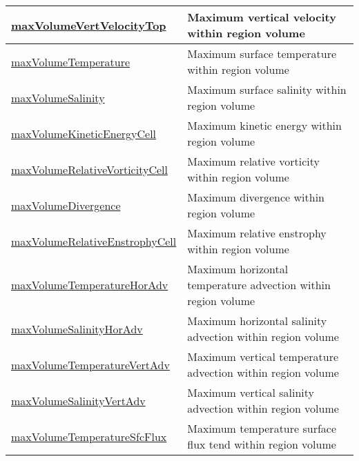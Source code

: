 {\begin{center}
\begin{longtable}{| p{2.0in} | p{4.0in} |}
    \hline
    \hyperref[subsec:var_sec_layerVolumeWeightedAverageAM_maxVolumeVertVelocityTop]{maxVolumeVertVelocityTop} & Maximum vertical velocity within region volume \\
    \hline
    \hyperref[subsec:var_sec_layerVolumeWeightedAverageAM_maxVolumeTemperature]{maxVolumeTemperature} & Maximum surface temperature within region volume \\
    \hline
    \hyperref[subsec:var_sec_layerVolumeWeightedAverageAM_maxVolumeSalinity]{maxVolumeSalinity} & Maximum surface salinity within region volume \\
    \hline
    \hyperref[subsec:var_sec_layerVolumeWeightedAverageAM_maxVolumeKineticEnergyCell]{maxVolumeKineticEnergyCell} & Maximum kinetic energy within region volume \\
    \hline
    \hyperref[subsec:var_sec_layerVolumeWeightedAverageAM_maxVolumeRelativeVorticityCell]{maxVolumeRelativeVorticityCell} & Maximum relative vorticity within region volume \\
    \hline
    \hyperref[subsec:var_sec_layerVolumeWeightedAverageAM_maxVolumeDivergence]{maxVolumeDivergence} & Maximum divergence within region volume \\
    \hline
    \hyperref[subsec:var_sec_layerVolumeWeightedAverageAM_maxVolumeRelativeEnstrophyCell]{maxVolumeRelativeEnstrophy\-Cell} & Maximum relative enstrophy within region volume \\
    \hline
    \hyperref[subsec:var_sec_layerVolumeWeightedAverageAM_maxVolumeTemperatureHorAdv]{maxVolumeTemperatureHorAdv} & Maximum horizontal temperature advection within region volume \\
    \hline
    \hyperref[subsec:var_sec_layerVolumeWeightedAverageAM_maxVolumeSalinityHorAdv]{maxVolumeSalinityHorAdv} & Maximum horizontal salinity advection within region volume \\
    \hline
    \hyperref[subsec:var_sec_layerVolumeWeightedAverageAM_maxVolumeTemperatureVertAdv]{maxVolumeTemperatureVertAdv} & Maximum vertical temperature advection within region volume \\
    \hline
    \hyperref[subsec:var_sec_layerVolumeWeightedAverageAM_maxVolumeSalinityVertAdv]{maxVolumeSalinityVertAdv} & Maximum vertical salinity advection within region volume \\
    \hline
    \hyperref[subsec:var_sec_layerVolumeWeightedAverageAM_maxVolumeTemperatureSfcFlux]{maxVolumeTemperatureSfcFlux} & Maximum temperature surface flux tend within region volume \\

\end{longtable}
\end{center}}
